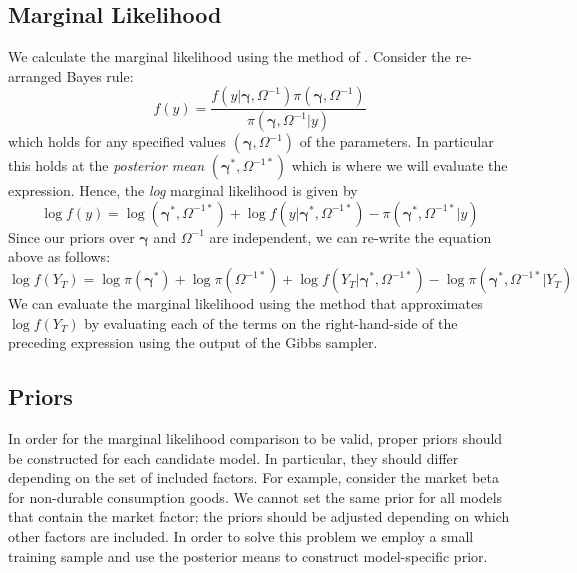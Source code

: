 \subsection{Marginal Likelihood}
We calculate the marginal likelihood using the method of \cite{chib1995marginal}.
Consider the re-arranged Bayes rule:
\begin{equation*}
f(y) = \frac{f(y|\boldsymbol{\gamma},\Omega^{-1})\pi\left(\boldsymbol{\gamma}, \Omega^{-1}\right)}{\pi\left(\boldsymbol{\gamma}, \Omega^{-1}|y \right)}
\end{equation*}
which holds for any specified values $(\boldsymbol{\gamma},\Omega^{-1})$ of the parameters.
In particular this holds at the \emph{posterior mean} $(\boldsymbol{\gamma}^*,\Omega^{-1*})$ which is where we will evaluate the expression.
Hence, the \emph{log} marginal likelihood is given by
\begin{equation*}
\log{f(y)} =  \log \left(\boldsymbol{\gamma}^*, \Omega^{-1*}\right) + \log{f(y|\boldsymbol{\gamma}^*,\Omega^{-1*})} - \pi\left(\boldsymbol{\gamma}^*, \Omega^{-1*}|y \right)
\end{equation*}
Since our priors over $\boldsymbol{\gamma}$ and $\Omega^{-1}$ are independent, we can re-write the equation above as follows:
\begin{equation*}
\log f(Y_T) = \log \pi(\boldsymbol{\gamma}^*) + \log \pi\left( \Omega^{-1*} \right) + \log f\left( Y_T|\boldsymbol{\gamma}^*, \Omega^{-1*} \right) - \log \pi\left( \boldsymbol{\gamma}^*, \Omega^{-1*}|Y_T \right)
\end{equation*}
We can evaluate the marginal likelihood using the \cite{chib1995marginal} method that approximates $\log f(Y_T)$ by evaluating each of the terms on the right-hand-side of the preceding expression using the output of the Gibbs sampler.

\subsection{Priors}
In order for the marginal likelihood comparison to be valid, proper priors should be constructed for each candidate model. 
In particular, they should differ depending on the set of included factors.
For example, consider the market beta for non-durable consumption goods. 
We cannot set the same prior for all models that contain the market factor: the priors should be adjusted depending on which other factors are included. 
In order to solve this problem we employ a small training sample and use the posterior means to construct  model-specific prior.

